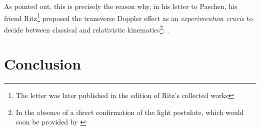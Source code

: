 \documentclass[pdflatex]{sn-jnl}
\newcommand{\tDe}{transverse Doppler effect\xspace}
\newcommand{\me}{; my emphasis}
\begin{document}
%
As \Ehr pointed out, this is precisely the reason why, in his letter to Paschen, his friend Ritz\footnote{The letter was later published in the \citeyear{Ritz1911} edition of Ritz’s collected works} proposed the \tDe as an \textit{experimentum crucis} to decide between classical and relativistic kinematics\footnote{In the absence of a direct confirmation of the light postulate, which would soon be provided by \citet{Sitter1913}}:  \citep[319\me]{Ehrenfest1912}.

\section*{Conclusion}
\end{document}
